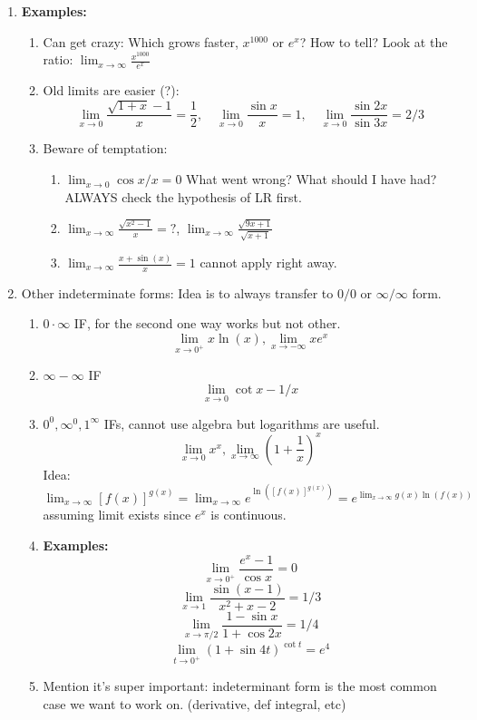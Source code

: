 \documentclass{article}
\newcommand{\ds}{\displaystyle}
\begin{document}
\begin{enumerate}
\item {\bf Examples:}
\begin{enumerate}
\item Can get crazy: Which grows faster, $x^{1000}$ or $e^x$? How to tell? Look at the ratio: $\ds \lim_{x\rightarrow \infty} \frac{x^{1000}}{e^x}$
\item Old limits are easier (?):
$$
\lim_{x\rightarrow 0} \frac{\sqrt{1+x}-1}{x} = \frac{1}{2}, \quad \lim_{x\rightarrow 0 } \frac{\sin x}{x} = 1,\quad 
\lim_{x\rightarrow 0} \frac{\sin 2x}{\sin 3x} = 2/3
$$
\item Beware of temptation: 
\begin{enumerate}
\item $\lim_{x\rightarrow 0 }\cos x/x = 0$ What went wrong? What should I have had? ALWAYS check the hypothesis of LR first.
\item $\lim_{x\rightarrow \infty} \frac{\sqrt{x^2-1}}{x} = ?$, $\lim_{x \rightarrow \infty} \frac{\sqrt{9x+1}}{\sqrt{x+1}}$
\item $\lim_{x\rightarrow \infty} \frac{x+\sin(x)}{x} = 1$ cannot apply right away.
\end{enumerate}
\end{enumerate}

\item Other indeterminate forms: Idea is to always transfer to $0/0$ or $\infty/\infty$ form.
\begin{enumerate}
\item $0\cdot\infty$ IF, for the second one way works but not other.
$$
\lim_{x\rightarrow 0^+}x\ln(x), \lim_{x\rightarrow -\infty}xe^x
$$
\item $\infty - \infty$ IF
$$
\lim_{x\rightarrow 0} \cot x -1/x
$$
\item $0^0, \infty^0, 1^\infty$ IFs, cannot use algebra but logarithms are useful.
$$
\lim_{x\rightarrow 0 }x^x, \lim_{x\rightarrow \infty }(1+\frac{1}{x})^x
$$
Idea: $\ds \lim_{x\rightarrow \infty} [f(x)]^{g(x)} =\lim_{x\rightarrow \infty} e^{\ln([f(x)]^{g(x)})} = e^{\lim_{x\rightarrow \infty} g(x)\ln(f(x))}$ assuming limit exists since $e^x$ is continuous.

\item {\bf Examples:} 
$$
\lim_{x\rightarrow 0^+ } \frac{e^x-1}{\cos x} = 0
$$
$$
\lim_{x\rightarrow 1} \frac{\sin (x-1)}{x^2+x-2} = 1/3
$$
$$
\lim_{x\rightarrow \pi/2 } \frac{1-\sin x}{1+\cos 2x} = 1/4
$$
$$
\lim_{t\rightarrow 0^+ } (1+\sin 4t)^{\cot t}= e^4
$$
\item Mention it's super important: indeterminant form is the most common case we want to work on. (derivative, def integral, etc)
\end{enumerate}
\end{enumerate}
\end{document}
